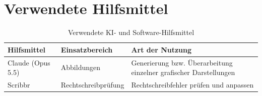 \section*{Verwendete Hilfsmittel}

\begin{table}[H]
    \centering
    \begin{tabular}{p{3.2cm} p{4cm} p{7cm}}
        \toprule
        \textbf{Hilfsmittel} & \textbf{Einsatzbereich} & \textbf{Art der Nutzung} \\
        \midrule
        
        Claude (Opus 5.5)
        & Abbildungen
        & Generierung bzw. Überarbeitung einzelner grafischer Darstellungen \\


        Scribbr & Rechtschreibprüfung & Rechtschreibfehler prüfen und anpassen \\
        
        \bottomrule
    \end{tabular}
    \caption{Verwendete KI- und Software-Hilfsmittel}
    \label{tab:hilfsmittel}
\end{table}